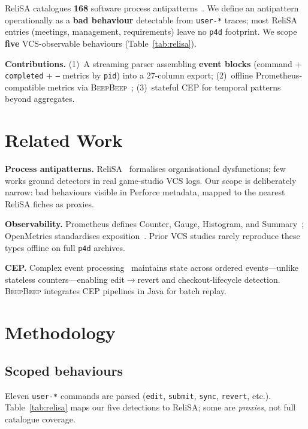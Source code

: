 \documentclass[conference]{IEEEtran}
\newcommand{\beepbeep}{\textsc{BeepBeep}}
\begin{document}
ReliSA catalogues \textbf{168} software process antipatterns~\cite{relisa_catalogue}.
We define an antipattern operationally as a \textbf{bad behaviour} detectable
from \texttt{user-*} traces; most ReliSA entries (meetings, management,
requirements) leave no \texttt{p4d} footprint. We scope \textbf{five}
VCS-observable behaviours (Table~\ref{tab:relisa}).

\textbf{Contributions.} (1)~A streaming parser assembling \textbf{event
blocks} (command + \texttt{completed} + \texttt{---} metrics by
\texttt{pid}) into a 27-column export; (2)~offline Prometheus-compatible
metrics via \beepbeep{}~\cite{hallé_beepbeep}; (3)~stateful CEP for
temporal patterns beyond aggregates.

\section{Related Work}
\label{sec:etat}

\textbf{Process antipatterns.} ReliSA~\cite{relisa_catalogue} formalises
organisational dysfunctions; few works ground detectors in real game-studio
VCS logs. Our scope is deliberately narrow: bad behaviours visible in
Perforce metadata, mapped to the nearest ReliSA fiches as proxies.

\textbf{Observability.} Prometheus defines Counter, Gauge, Histogram, and
Summary~\cite{prometheus_metric_types,prometheus_java_client}; OpenMetrics
standardises exposition~\cite{openmetrics}. Prior VCS studies rarely
reproduce these types offline on full \texttt{p4d} archives.

\textbf{CEP.} Complex event processing~\cite{luckham_cep} maintains state
across ordered events---unlike stateless counters---enabling edit$\rightarrow$revert
and checkout-lifecycle detection. \beepbeep{} integrates CEP pipelines in
Java for batch replay.

\section{Methodology}
\label{sec:methodo}

\subsection{Scoped behaviours}
Eleven \texttt{user-*} commands are parsed
(\texttt{edit}, \texttt{submit}, \texttt{sync}, \texttt{revert}, etc.).
Table~\ref{tab:relisa} maps our five detections to ReliSA; some are
\emph{proxies}, not full catalogue coverage.
\end{document}
